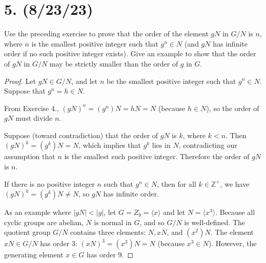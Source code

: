 \documentclass{article}
\begin{document}
\section*{5. (8/23/23)}

Use the preceding exercise to prove that the order of the element $gN$ in $G/N$ is $n$, where $n$ is the smallest positive integer such that $g^n \in N$ (and $gN$ has infinite order if no such positive integer exists). Give an example to show that the order of $gN$ in $G/N$ may be strictly smaller than the order of $g$ in $G$.

\begin{proof}
    Let $gN \in G/N$, and let $n$ be the smallest positive integer such that $g^n \in N$. Suppose that $g^n = h \in N$.

    From Exercise 4., $(gN)^n = (g^n)N = hN = N$ (because $h \in N$), so the order of $gN$ must divide $n$.

    Suppose (toward contradiction) that the order of $gN$ is $k$, where $k < n$. Then $(gN)^k = (g^k)N = N$, which implies that $g^k$ lies in $N$, contradicting our assumption that $n$ is the smallest such positive integer. Therefore the order of $gN$ is $n$.

    If there is no positive integer $n$ such that $g^n \in N$, then for all $k \in \mathbb{Z}^+$, we have $(gN)^k = (g^k)N \neq N$, so $gN$ has infinite order.

    As an example where $|gN| < |g|$, let $G = Z_9 = \langle x \rangle$ and let $N = \langle x^3 \rangle$. Because all cyclic groups are abelian, $N$ is normal in $G$, and so $G/N$ is well-defined. The quotient group $G/N$ contains three elements: $N, xN$, and $(x^2)N$. The element $xN \in G/N$ has order 3: $(xN)^3 = (x^3)N = N$ (because $x^3 \in N$). However, the generating element $x \in G$ has order 9.
\end{proof}
\end{document}
